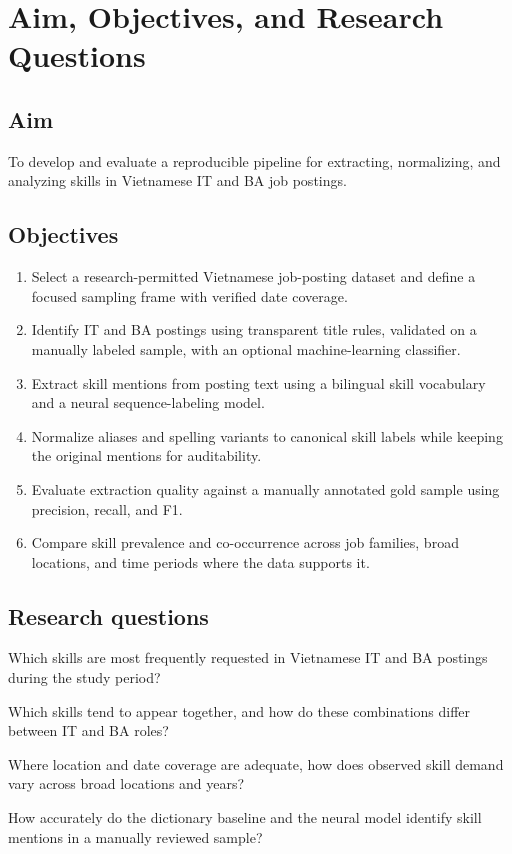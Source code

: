 \documentclass[12pt,a4paper]{article}
\begin{document}
\section{Aim, Objectives, and Research Questions}

\subsection{Aim}
To develop and evaluate a reproducible pipeline for extracting, normalizing,
and analyzing skills in Vietnamese IT and BA job postings.

\subsection{Objectives}
\begin{enumerate}
  \item Select a research-permitted Vietnamese job-posting dataset and define
        a focused sampling frame with verified date coverage.
  \item Identify IT and BA postings using transparent title rules, validated
        on a manually labeled sample, with an optional machine-learning
        classifier.
  \item Extract skill mentions from posting text using a bilingual skill
        vocabulary and a neural sequence-labeling model.
  \item Normalize aliases and spelling variants to canonical skill labels
        while keeping the original mentions for auditability.
  \item Evaluate extraction quality against a manually annotated gold sample
        using precision, recall, and F1.
  \item Compare skill prevalence and co-occurrence across job families,
        broad locations, and time periods where the data supports it.
\end{enumerate}

\subsection{Research questions}
\begin{description}[leftmargin=3.2em,style=nextline]
  \item[RQ1.] Which skills are most frequently requested in Vietnamese IT and
        BA postings during the study period?
  \item[RQ2.] Which skills tend to appear together, and how do these
        combinations differ between IT and BA roles?
  \item[RQ3.] Where location and date coverage are adequate, how does
        observed skill demand vary across broad locations and years?
  \item[RQ4.] How accurately do the dictionary baseline and the neural model
        identify skill mentions in a manually reviewed sample?
\end{description}
\end{document}
